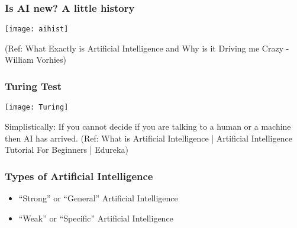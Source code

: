 \begin{frame}[fragile]\frametitle{Is AI new? A little history}
\begin{center}
\texttt{[image: aihist]}
\end{center}
{\tiny (Ref:  What Exactly is Artificial Intelligence and Why is it Driving me Crazy - William Vorhies)}
\end{frame}

\begin{frame}[fragile]\frametitle{Turing Test}
\begin{center}
\texttt{[image: Turing]}
\end{center}
Simplistically: If you cannot decide if you are talking to a human or a machine then AI has arrived.
{\tiny (Ref:  What is Artificial Intelligence | Artificial Intelligence Tutorial For Beginners | Edureka)}
\end{frame}





\begin{frame}[fragile]\frametitle{Types of Artificial Intelligence}
\begin{itemize}
\item  ``Strong'' or ``General'' Artificial Intelligence
\item  ``Weak'' or ``Specific'' Artificial Intelligence
\end{itemize}
\end{frame}

